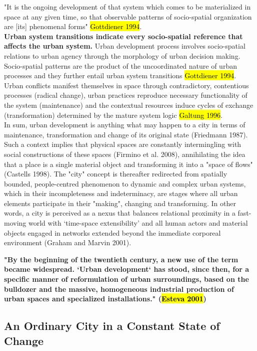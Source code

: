 \documentclass[11pt]{report}
\begin{document}
"It is the ongoing development of that system which comes to be materialized in space at any given time, so that observable patterns of socio-spatial organization are [its] phenomenal forms" \hl{Gottdiener 1994}.
\\
\textbf{Urban system transitions indicate every socio-spatial reference that affects the urban system.}
Urban development process involves socio-spatial relations to urban agency through the morphology of urban decision making.
Socio-spatial patterns are the product of the uncoordinated nature of urban processes and they further entail urban system transitions \hl{Gottdiener 1994}.
Urban conflicts manifest themselves in space through contradictory, contentious processes (radical change), urban practices reproduce necessary functionality of the system (maintenance) and the contextual resources induce cycles of exchange (transformation) determined by the mature system logic \hl{Galtung 1996}.
\\  
In sum, urban development is anything what may happen to a city in terms of maintenance, transformation and change of its original state (Friedmann 1987). Such a context implies that physical spaces are constantly intermingling with social constructions of these spaces (Firmino et al. 2008), annihilating the idea that a place is a single material object and transforming it into a "space of flows" (Castells 1998). The "city" concept is thereafter redirected from spatially bounded, people-centred phenomenon to dynamic and complex urban systems, which in their incompleteness and indeterminacy, are stages where all urban elements participate in their "making", changing and transforming. In other words, a city is perceived as a nexus that balances relational proximity in a fast-moving world with ‘time-space extensibility’ and all human actors and material objects engaged in networks extended beyond the immediate corporeal environment (Graham and Marvin 2001).  

\textbf{"By the beginning of the twentieth century, a new use of the term became widespread. ‘Urban development‘ has stood, since then, for a specific manner of reformulation of urban surroundings, based on the bulldozer and the massive, homogeneous industrial production of urban spaces and specialized installations." (\hl{Esteva 2001})}

\subsection{An Ordinary City in a Constant State of Change}
\end{document}
